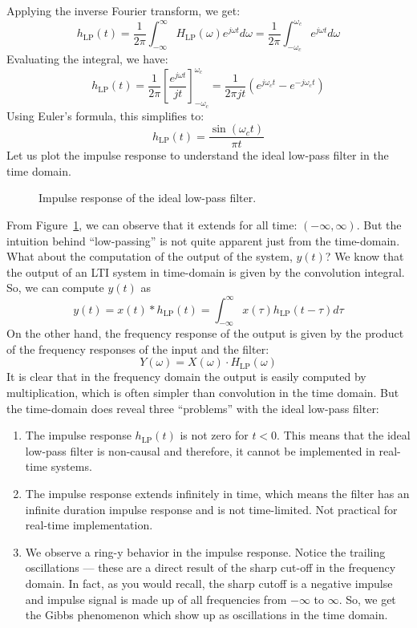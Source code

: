 Applying the inverse Fourier transform, we get:
\[
h_{\text{LP}}(t) = \frac{1}{2\pi} \int_{-\infty}^{\infty} H_{\text{LP}}(\omega) e^{j \omega t} d\omega = \frac{1}{2\pi} \int_{-\omega_c}^{\omega_c} e^{j \omega t} d\omega
\]
Evaluating the integral, we have:
\[
h_{\text{LP}}(t) = \frac{1}{2\pi} \left[ \frac{e^{j \omega t}}{j t} \right]_{-\omega_c}^{\omega_c} = \frac{1}{2\pi j t} \left( e^{j \omega_c t} - e^{-j \omega_c t} \right)
\]
Using Euler's formula, this simplifies to:
\[
h_{\text{LP}}(t) = \frac{\sin (\omega_c t)}{\pi t}
\]
Let us plot the impulse response to understand the ideal low-pass filter in the time domain.
\begin{figure}[h]
    \centering
    \caption{Impulse response of the ideal low-pass filter.}
    \label{fig:impulse_response_ideal_lowpass}
\end{figure}
From Figure~\ref{fig:impulse_response_ideal_lowpass}, we can observe that it extends for all time: $(-\infty, \infty)$. But the intuition behind ``low-passing'' is not quite apparent just from the time-domain. What about the computation of the output of the system, $y(t)$? We know that the output of an LTI system in time-domain is given by the convolution integral. So, we can compute $y(t)$ as
\[
y(t) = x(t) * h_{\text{LP}}(t) = \int_{-\infty}^{\infty} x(\tau) h_{\text{LP}}(t - \tau) d\tau
\]
On the other hand, the frequency response of the output is given by the product of the frequency responses of the input and the filter:
\[
Y(\omega) = X(\omega) \cdot H_{\text{LP}}(\omega)
\]
It is clear that in the frequency domain the output is easily computed by multiplication, which is often simpler than convolution in the time domain. But the time-domain does reveal three ``problems'' with the ideal low-pass filter:
\begin{enumerate}
    \item The impulse response $h_{\text{LP}}(t)$ is not zero for $t < 0$. This means that the ideal low-pass filter is non-causal and therefore, it cannot be implemented in real-time systems.
    \item The impulse response extends infinitely in time, which means the filter has an infinite duration impulse response and is not time-limited. Not practical for real-time implementation.
    \item We observe a ring-y behavior in the impulse response. Notice the trailing oscillations --- these are a direct result of the sharp cut-off in the frequency domain. In fact, as you would recall, the sharp cutoff is a negative impulse and impulse signal is made up of all frequencies from $-\infty$ to $\infty$. So, we get the Gibbs phenomenon which show up as oscillations in the time domain.
\end{enumerate}

